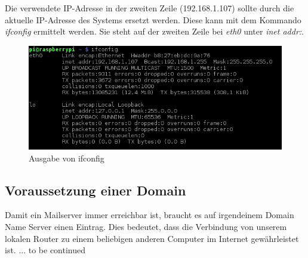 Die verwendete IP-Adresse in der zweiten Zeile (192.168.1.107) sollte durch die aktuelle IP-Adresse des Systems ersetzt werden. Diese kann mit dem Kommando \textit{ifconfig} ermittelt werden. Sie steht auf der zweiten Zeile bei \textit{eth0} unter \textit{inet addr:}.

\begin{figure}[H]
\centering
\includegraphics[scale=0.65]{images/ifconfig}
\caption{Ausgabe von ifconfig}
\end{figure}

\subsection{Voraussetzung einer Domain}
Damit ein Mailserver immer erreichbar ist, braucht es auf irgendeinem Domain Name Server einen Eintrag. Dies bedeutet, dass die Verbindung von unserem lokalen Router zu einem beliebigen anderen Computer im Internet gewährleistet ist.
... to be continued






